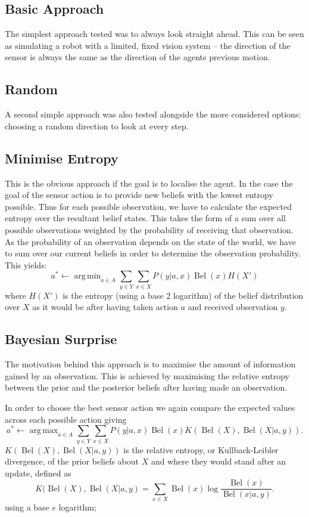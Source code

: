 \documentclass{article}
\DeclareMathOperator*{\argmax}{arg\,max}
\DeclareMathOperator*{\argmin}{arg\,min}
\DeclareMathOperator{\bel}{Bel}
\begin{document}
\subsection{Basic Approach}
The simplest approach tested was to always look straight ahead. This can be seen as 
simulating a robot with a limited, fixed vision system -- the direction of the sensor is
always the same as the direction of the agents previous motion.

\subsection{Random}
A second simple approach was also tested alongside the more considered options: choosing
a random direction to look at every step. 

\subsection{Minimise Entropy}
This is the obvious approach if the goal is to localise the agent. In the case the goal of
the sensor action is to provide new beliefs with the lowest entropy possible. Thus for
each possible observation, we have to calculate the expected entropy over the resultant
belief states. This takes the form of a sum over all possible observations weighted by the
probability of receiving that observation. As the probability of an observation depends on
the state of the world, we have to sum over our current beliefs in order to determine the
observation probability. This yields: 
\[
	a^* \gets \argmin_{a \in A} \sum_{y \in {Y}} \sum_{x \in X} P(y|a,x) \bel(x) H(X')
\]
where \(H(X')\) is the entropy (using a base 2 logarithm) of the belief distribution
over \(X\) as it would be after having taken action \(a\) and received observation \(y\).


\subsection{Bayesian Surprise}
The motivation behind this approach is to maximise the amount of information gained by an
observation. This is achieved by maximising the relative entropy between the prior and the 
posterior beliefs after having made an observation.   
 \autocite{itti2005bayesian, baldi2010bits}
 
In order to choose the best sensor action we again compare the expected values across each 
possible action giving
\[
	a^* \gets \argmax_{a \in A} \sum_{y \in Y} \sum_{x \in X} P(y | a,x)\bel(x)K(\bel(X),\bel(X|a,y)).
\]
\(K(\bel(X), \bel(X|a,y))\) is the relative entropy, or Kullback-Leibler divergence, of 
the prior beliefs about \(X\) and where they would stand after an update, defined as
\[
	K(\bel(X), \bel(X | a,y) = \sum_{x \in X} \bel(x) \log \frac{\bel(x)}{\bel(x | a,y)}.
\] using a base \(e\) logarithm;
\end{document}
